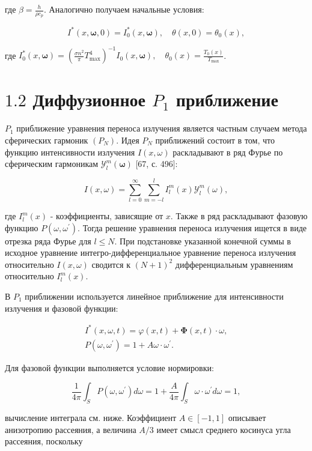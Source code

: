 \documentclass[10pt]{article}
\begin{document}
где $\beta=\frac{h}{\rho c_{p}}$. Аналогично получаем начальные условия:

$$
I^{*}(x, \boldsymbol{\omega}, 0)=I_{0}^{*}(x, \boldsymbol{\omega}), \quad \theta(x, 0)=\theta_{0}(x),
$$

где $I_{0}^{*}(x, \boldsymbol{\omega})=\left(\frac{\sigma n^{2}}{\pi} T_{\max }^{4}\right)^{-1} I_{0}(x, \boldsymbol{\omega}), \quad \theta_{0}(x)=\frac{T_{0}(x)}{T_{\max }}$.

\section{$1.2$ Диффузионное $P_{1}$ приближение}
$P_{1}$ приближение уравнения переноса излучения является частным случаем метода сферических гармоник $\left(P_{N}\right)$. Идея $P_{N}$ приближений состоит в том, что функцию интенсивности излучения $I(x, \omega)$ раскладывают в ряд Фурье по сферическим гармоникам $\mathcal{Y}_{l}^{m}(\boldsymbol{\omega})$ [67, с. 496]:

$$
I(x, \omega)=\sum_{l=0}^{\infty} \sum_{m=-l}^{l} I_{l}^{m}(x) \mathcal{Y}_{l}^{m}(\omega),
$$

где $I_{l}^{m}(x)$ - коэффициенты, зависящие от $x$. Также в ряд раскладывают фазовую функцию $P\left(\omega, \omega^{\prime}\right)$. Тогда решение уравнения переноса излучения ищется в виде отрезка ряда Фурье для $l \leqslant N$. При подстановке указанной конечной суммы в исходное уравнение интегро-дифференциальное уравнение переноса излучения относительно $I(x, \omega)$ сводится к $(N+1)^{2}$ дифференциальным уравнениям относительно $I_{l}^{m}(x)$.

В $P_{1}$ приближении используется линейное приближение для интенсивности излучения и фазовой функции:

$$
\begin{gathered}
I^{*}(x, \omega, t)=\varphi(x, t)+\boldsymbol{\Phi}(x, t) \cdot \omega, \\
P\left(\omega, \omega^{\prime}\right)=1+A \omega \cdot \omega^{\prime} .
\end{gathered}
$$

Для фазовой функции выполняется условие нормировки:

$$
\frac{1}{4 \pi} \int_{S} P\left(\omega, \omega^{\prime}\right) d \omega=1+\frac{A}{4 \pi} \int_{S} \omega \cdot \omega^{\prime} d \omega=1,
$$

вычисление интеграла см. ниже. Коэффициент $A \in[-1,1]$ описывает анизотропию рассеяния, а величина $A / 3$ имеет смысл среднего косинуса угла рассеяния, поскольку
\end{document}
